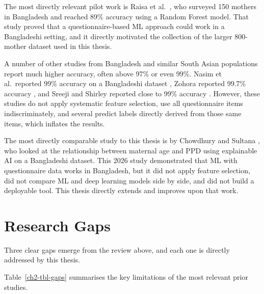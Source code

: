 The most directly relevant pilot work is Raisa et al.\ \cite{raisa2022machine}, who surveyed 150 mothers in Bangladesh and reached 89\% accuracy using a Random Forest model. That study proved that a questionnaire-based ML approach could work in a Bangladeshi setting, and it directly motivated the collection of the larger 800-mother dataset used in this thesis.

A number of other studies from Bangladesh and similar South Asian populations report much higher accuracy, often above 97\% or even 99\%. Nasim et al.\ reported 99\% accuracy on a Bangladeshi dataset \cite{nasim2024novel}, Zohora reported 99.7\% accuracy \cite{zohora2024machine}, and Sreeji and Shirley reported close to 99\% accuracy \cite{sreeji2026predicting}. However, these studies do not apply systematic feature selection, use all questionnaire items indiscriminately, and several predict labels directly derived from those same items, which inflates the results.

The most directly comparable study to this thesis is by Chowdhury and Sultana \cite{chowdhury2026assessing}, who looked at the relationship between maternal age and PPD using explainable AI on a Bangladeshi dataset. This 2026 study demonstrated that ML with questionnaire data works in Bangladesh, but it did not apply feature selection, did not compare ML and deep learning models side by side, and did not build a deployable tool. This thesis directly extends and improves upon that work.

\section{Research Gaps}
\label{ch2-sec-gaps}

Three clear gaps emerge from the review above, and each one is directly addressed by this thesis.

Table~\ref{ch2-tbl-gaps} summarises the key limitations of the most relevant prior studies.

